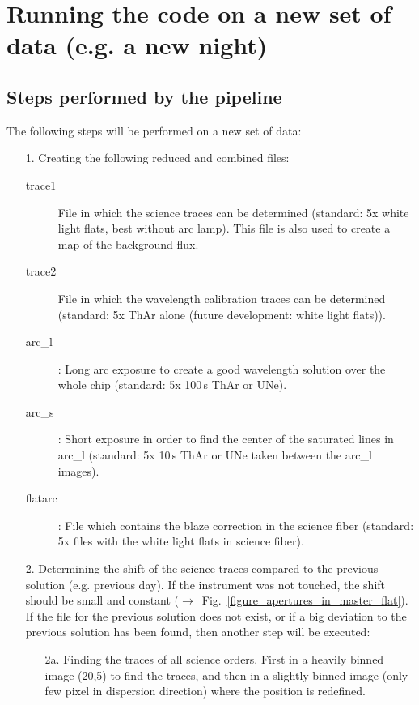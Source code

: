 \documentclass[10pt,a4paper]{article}
\begin{document}


\newpage
\section{Running the code on a new set of data (e.g. a new night)}


\subsection{Steps performed by the pipeline}
\label{Section:pipeline_steps_general}

\noindent The following steps will be performed on a new set of data:
\begin{itemize}
  \item[1.] Creating the following reduced and combined files:
  \begin{description}
    \item[trace1] File in which the science traces can be determined (standard: 5x white light flats, best without arc lamp). This file is also used to create a map of the background flux.
    \item[trace2] File in which the wavelength calibration traces can be determined (standard: 5x ThAr alone (future development: white light flats)).
    \item[arc\_l]: Long arc exposure to create a good wavelength solution over the whole chip (standard: 5x 100\,s ThAr or UNe).
    \item[arc\_s]: Short exposure in order to find the center of the saturated lines in arc\_l (standard: 5x 10\,s ThAr or UNe taken between the arc\_l images).
    \item[flatarc]: File which contains the blaze correction in the science fiber (standard: 5x files with the white light flats in science fiber).
  \end{description}
  \item[2.] Determining the shift of the science traces compared to the previous solution (e.g. previous day). If the instrument was not touched, the shift should be small and constant ($\rightarrow$~Fig.~\ref{figure_apertures_in_master_flat}). If the file for the previous solution does not exist, or if a big deviation to the previous solution has been found, then another step will be executed:
  \begin{itemize}
    \item[2a.] Finding the traces of all science orders. First in a heavily binned image (20,5) to find the traces, and then in a slightly binned image (only few pixel in dispersion direction) where the position is redefined.

\end{itemize}
\end{itemize}
\end{document}
